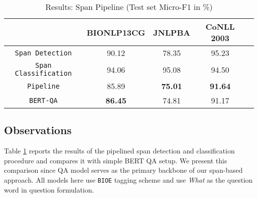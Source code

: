\begin{table}[h!]
\centering
\begin{tabular}{|c|c|c|c|c|}\hline
	\textbf{} & \textbf{BIONLP13CG} & \textbf{JNLPBA} & \textbf{CoNLL 2003}\\\hline
	\texttt{Span Detection} & 90.12 & 78.35 & 95.23\\\hline
	\texttt{Span Classification} & 94.06 & 95.08 & 94.50\\\hline
	\texttt{Pipeline} & 85.89 & \textbf{75.01} & \textbf{91.64}\\\hline
	\texttt{BERT-QA} & \textbf{86.45} & 74.81 & 91.17\\\hline
	\end{tabular}
    \caption{Results: Span Pipeline (Test set Micro-F1 in \%)}
    \label{tab:res_span}
\end{table}

\subsection{Observations}
Table \ref{tab:res_span} reports the results of the pipelined span detection and classification procedure and compares it with simple BERT QA setup. We present this comparison since QA model serves as the primary backbone of our span-based approach. All models here use \texttt{BIOE} tagging scheme and use \textit{What} as the question word in question formulation.

